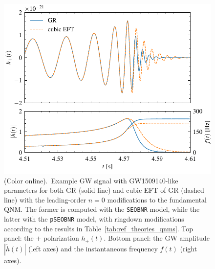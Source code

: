 \documentclass[twocolumn,
               prd,
               aps,
               superscriptaddress,
               tightenlines,
               nofootinbib,
               eqsecnum,
               amsfonts,
               amsmath,
               longbibliography]{revtex4-1}
\newcommand{\pSEOB}{\texttt{pSEOBNR}}
\newcommand{\SEOB}{\texttt{SEOBNR}}
\begin{document}
\begin{figure}[t]
\includegraphics[width=\columnwidth]{figs/example_waveform_cubicEFT.pdf}
\caption{(Color online).~Example GW signal with GW1509140-like parameters
for both GR (solid line) and cubic EFT of GR (dashed line) with the leading-order
$n=0$ modifications to the fundamental QNM.
%
The former is computed with the \SEOB{} model, while the latter with the
\pSEOB{} model, with ringdown modifications according to the results in
Table~\ref{tab:ref_theories_qnms}.
%
Top panel: the $+$ polarization $h_{+}(t)$. Bottom panel: the GW amplitude
$|\tilde{h}(t)|$ (left axes) and the instantaneous frequency $f(t)$ (right axes).
}
\label{fig:example_waveform}
\end{figure}
\end{document}
